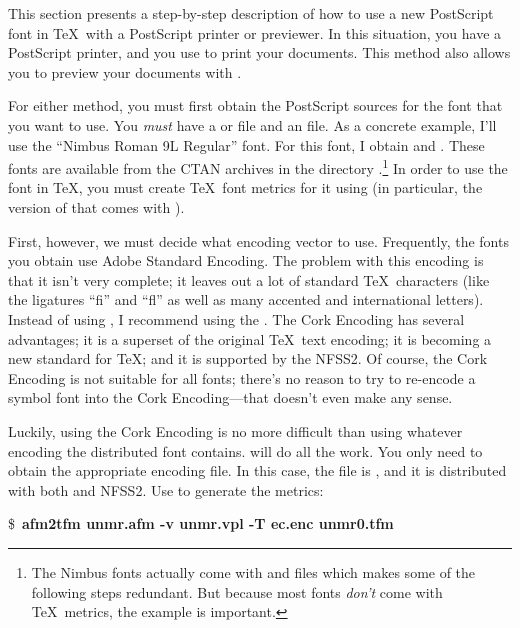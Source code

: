 This section presents a step-by-step description of how
to use a new PostScript font in \TeX\ with a PostScript printer or previewer.
In this situation, you have a PostScript
printer, and you use  to print your documents.  This
method also allows you to preview your documents with
.

For either method, you must first obtain the PostScript sources for
the font that you want to use.  You {\em must\/} have a  or
 file and an  file.  As a concrete example, I'll use
the ``Nimbus Roman 9L Regular'' font.  For this font, I obtain
 and .  These fonts are
available from the CTAN archives in the directory
.\footnote{The Nimbus fonts actually come with
 and  files which makes some of the following steps
redundant.  But because most fonts \emph{don't} come with \TeX\ metrics,
the example is important.}
In order to use the font in \TeX, you must create \TeX\ font metrics
for it using  (in particular, the version of
 that comes with ).  

First, however, we must decide what encoding vector to use.
Frequently, the fonts you obtain use Adobe Standard Encoding.
The problem with this encoding is that it isn't very complete; it
leaves out a lot of standard \TeX\ characters (like the ligatures
``fi'' and ``fl'' as well as many accented and international letters).
Instead of using , I recommend using 
the .  The Cork Encoding has 
several advantages; it is a superset
of the original \TeX\ text encoding; it is becoming a new standard for
\TeX; and it is supported by the NFSS2.  Of course, the Cork Encoding
is not suitable for all fonts; there's no reason to try to re-encode a
symbol font into the Cork Encoding---that doesn't even make any sense.

Luckily, using the Cork Encoding is no more difficult than using
whatever encoding the distributed font contains.  
will do all the work.  You only need to obtain the appropriate encoding
file.  In this case, the file is , and it is distributed
with both  and NFSS2.
Use  to generate the metrics:

\begin{ttindent}
\$\ {\bf afm2tfm unmr.afm -v unmr.vpl -T ec.enc unmr0.tfm}
\end{ttindent}

